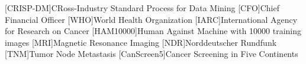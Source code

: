 \begin{acronym}[CRISP-DM]
[CRISP-DM]{CRoss-Industry Standard Process for Data Mining}
[CFO]{Chief Financial Officer}
[WHO]{World Health Organization}
[IARC]{International Agency for Research on Cancer}
[HAM10000]{Human Against Machine with 10000 training images}
[MRI]{Magnetic Resonance Imaging}
[NDR]{Norddeutscher Rundfunk}
[TNM]{Tumor Node Metastasis}
[CanScreen5]{Cancer Screening in Five Continents}
\end{acronym}